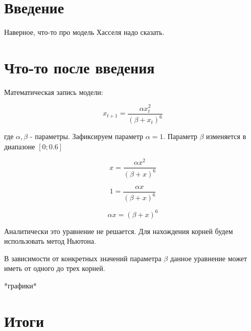 \section{Введение}

    Наверное, что-то про модель Хасселя надо сказать.

\section{Что-то после введения}

    Математическая запись модели:

    \[x_{t+1} = \frac{\alpha x_t^2}{(\beta + x_t)^6}\]

    где \(\alpha, \beta\) - параметры. Зафиксируем параметр \(\alpha = 1\). Параметр \(\beta\) изменяется в диапазоне \([0; 0.6]\)    

    \[x = \frac{\alpha x^2}{(\beta + x)^6}\]
    
    \[1 = \frac{\alpha x}{(\beta + x)^6}\]

    \[\alpha x = (\beta + x)^6\]

    Аналитически это уравнение не решается. Для нахождения корней будем использовать метод Ньютона.

    В зависимости от конкретных значений параметра \(\beta\) данное уравнение может иметь от одного до трех корней.
    
    *графики*

\section{Итоги}